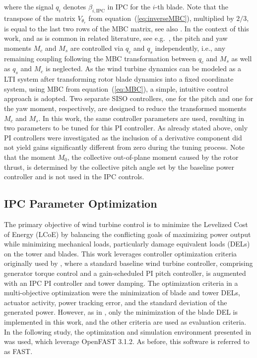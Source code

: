where the signal $q_i$ denotes $\beta_{i,\text{IPC}}$ in IPC for the $i$-th blade. %
 Note that the transpose of the matrix $V_{\theta_{r}}$ from equation~(\ref{eq:inverseMBC}), multiplied by $2/3$, is equal to the last two rows of the MBC matrix, see also \cite{ossmann2017load}. In the context of this work, and as is common in related literature, see e.g.~\cite{he2018combined}, the pitch and yaw moments $M_c$ and $M_s$ are controlled via $q_c$ and $q_s$ independently, i.e., any remaining coupling following the MBC transformation between $q_c$ and $M_s$ as well as $q_s$ and $M_c$ is neglected. As the wind turbine dynamics can be modeled as a LTI system after transforming rotor blade dynamics into a fixed coordinate system, using MBC from equation~(\ref{eq:MBC}), a simple, intuitive control approach is adopted. Two separate SISO controllers, one for the pitch and one for the yaw moment, respectively, are designed to reduce the transformed moments $M_c$ and $M_s$. In this work, the same controller parameters are used, resulting in two parameters to be tuned for this PI controller. As already stated above, only PI controllers were investigated as the inclusion of a derivative component did not yield gains significantly different from zero during the tuning process. Note that the moment $M_0$, the collective out-of-plane moment caused by the rotor thrust, is determined by the collective pitch angle set by the baseline power controller and is not used in the IPC controls.

\subsection{IPC Parameter Optimization} \label{subsection: IPCOptCriteria}
The primary objective of wind turbine control is to minimize the Levelized Cost of Energy (LCoE) by balancing the conflicting goals of maximizing power output while minimizing mechanical loads, particularly damage equivalent loads (DELs) on the tower and blades. This work leverages controller optimization criteria originally used by \cite{hoffmann2018load}, where a standard baseline wind turbine controller, comprising generator torque control and a gain-scheduled PI pitch controller, is augmented with an IPC PI controller and tower damping. The optimization criteria in a multi-objective optimization were the minimization of blade and tower DELs, actuator activity, power tracking error, and the standard deviation of the generated power. However, as in \cite{dittmer2024combined}, only the minimization of the blade DEL is implemented in this work, and the other criteria are used as evaluation criteria. In the following study, the optimization and simulation environment presented in \cite{dittmer2024combined} was used, which leverage OpenFAST 3.1.2. As before, this software is referred to as FAST.

